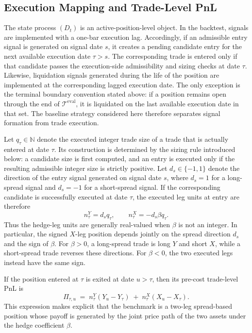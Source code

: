 \documentclass[11pt,a4paper]{article}
\begin{document}
\subsection{Execution Mapping and Trade-Level PnL}

The state process \((D_t)\) is an active-position-level object. In the backtest,
signals are implemented with a one-bar execution lag. Accordingly, if an
admissible entry signal is generated on signal date \(s\), it creates a pending
candidate entry for the next available execution date \(\tau>s\). The
corresponding trade is entered only if that candidate passes the execution-side
admissibility and sizing checks at date \(\tau\). Likewise, liquidation signals
generated during the life of the position are implemented at the corresponding
lagged execution date. The only exception is the terminal boundary convention
stated above: if a position remains open through the end of
\(\mathcal T^{\mathrm{eval}}\), it is liquidated on the last available
execution date in that set. The baseline strategy considered here therefore
separates signal formation from trade execution.

Let \(q_\tau \in \mathbb N\) denote the executed integer trade size of a trade
that is actually entered at date \(\tau\). Its construction is determined by
the sizing rule introduced below: a candidate size is first computed, and an
entry is executed only if the resulting admissible integer size is strictly
positive. Let \(d_s \in \{-1,1\}\) denote the direction of the entry signal
generated on signal date \(s\), where \(d_s=1\) for a long-spread signal and
\(d_s=-1\) for a short-spread signal. If the corresponding candidate is
successfully executed at date \(\tau\), the executed leg units at entry are
therefore
\[
  n^Y_\tau = d_s q_\tau,
  \qquad
  n^X_\tau = -d_s \beta q_\tau.
\]
Thus the hedge-leg units are generally real-valued when \(\beta\) is not an
integer. In particular, the signed \(X\)-leg position depends jointly on the
spread direction \(d_s\) and the sign of \(\beta\). For \(\beta>0\), a
long-spread trade is long \(Y\) and short \(X\), while a short-spread trade
reverses these directions. For \(\beta<0\), the two executed legs instead have
the same sign.

If the position entered at \(\tau\) is exited at date \(u>\tau\), then its
pre-cost trade-level PnL is
\[
  \Pi_{\tau,u}
  \;=\;
  n^Y_\tau (Y_u - Y_\tau)
  \;+\;
  n^X_\tau (X_u - X_\tau).
\]
This expression makes explicit that the benchmark is a two-leg spread-based
position whose payoff is generated by the joint price path of the two assets
under the hedge coefficient \(\beta\).
\end{document}
